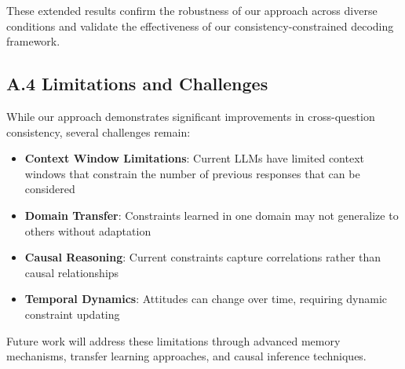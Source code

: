 \documentclass[sigconf, anonymous]{acmart}
\begin{document}
These extended results confirm the robustness of our approach across diverse conditions and validate the effectiveness of our consistency-constrained decoding framework.

\subsection*{A.4 Limitations and Challenges}

While our approach demonstrates significant improvements in cross-question consistency, several challenges remain:

\begin{itemize}
    \item \textbf{Context Window Limitations}: Current LLMs have limited context windows that constrain the number of previous responses that can be considered
    \item \textbf{Domain Transfer}: Constraints learned in one domain may not generalize to others without adaptation
    \item \textbf{Causal Reasoning}: Current constraints capture correlations rather than causal relationships
    \item \textbf{Temporal Dynamics}: Attitudes can change over time, requiring dynamic constraint updating
\end{itemize}

Future work will address these limitations through advanced memory mechanisms, transfer learning approaches, and causal inference techniques.
\end{document}
